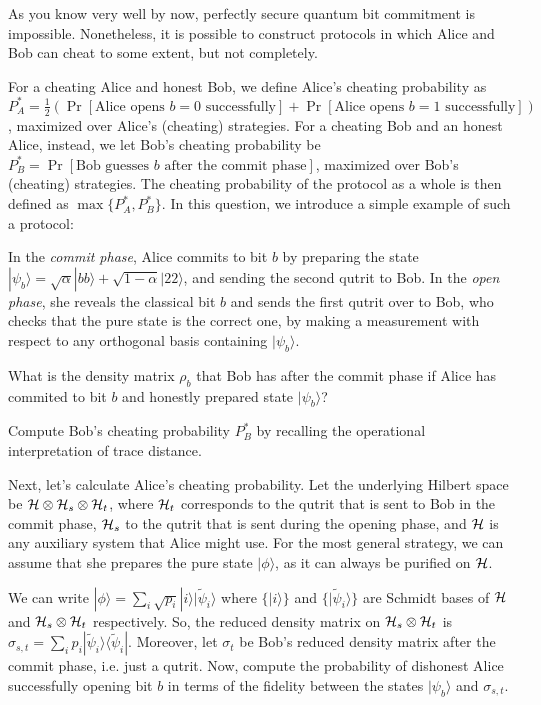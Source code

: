 \documentclass[a4paper,10pt,landscape,twocolumn]{scrartcl}
\newcommand{\ket}[1]{| #1 \rangle}
\newcommand{\bra}[1]{\langle #1 |}
\begin{document}
\begin{exercise}
As you know very well by now, perfectly secure quantum bit commitment is impossible. Nonetheless, it is possible to construct protocols in which Alice and Bob can cheat to some extent, but not completely. 

For a cheating Alice and honest Bob, we define Alice's cheating probability as $P_A^* = \frac12(\Pr[\text{Alice opens $b=0$ successfully}]+ \Pr[\text{Alice opens $b=1$ successfully}])$, maximized over Alice's (cheating) strategies. For a cheating Bob and an honest Alice, instead, we let Bob's cheating probability be
$P_B^*= \Pr[\text{Bob guesses $b$ after the commit phase}]$, maximized over Bob's (cheating) strategies. The cheating probability of the protocol as a whole is then defined as $\max\{P_A^*,P_B^*\}$. In this question, we introduce a simple example of such a protocol:

In the \emph{commit phase}, Alice commits to bit $b$ by preparing the state 
$\ket{\psi_b}= \sqrt{\alpha} \ket{bb} + \sqrt{1-\alpha} \ket{22}$, and sending the second qutrit to Bob. In the \emph{open phase}, she reveals the classical bit $b$ and sends the first qutrit over to Bob, who checks that the pure state is the correct one, by making a measurement with respect to any orthogonal basis containing $\ket{\psi_b}$.

\begin{subex}
What is the density matrix $\rho_b$ that Bob has after the commit phase if Alice has commited to bit $b$ and honestly prepared state $\ket{\psi_b}$?
\end{subex}

\begin{subex} \label{subex:bob}
Compute Bob's cheating probability $P_B^*$ by recalling the operational interpretation of trace distance.
\end{subex}

\begin{subex}
Next, let's calculate Alice's cheating probability. Let the underlying Hilbert space be $\mathcal{H} \otimes \mathcal{H}_s \otimes \mathcal{H}_t$, where $\mathcal{H}_t$ corresponds to the qutrit that is sent to Bob in the commit phase, $\mathcal{H}_s$ to the qutrit that is sent during the opening phase, and $\mathcal{H}$ is any auxiliary system that Alice might use. For the most general strategy, we can assume that she prepares the pure state $\ket{\phi}$, as it can always be purified on $\mathcal{H}$.

We can write $\ket{\phi} = \sum_i \sqrt{p_i} \ket{i} \ket{\tilde{\psi}_{i}}$ where $\{\ket{i}\}$ and $\{ \ket{\tilde{\psi}_{i}} \}$ are Schmidt bases of $\mathcal{H}$ and $\mathcal{H}_s \otimes \mathcal{H}_t$ respectively. So, the reduced density matrix on $\mathcal{H}_s \otimes \mathcal{H}_t$ is $\sigma_{s,t} = \sum_i p_i \ket{\tilde{\psi}_{i}}\bra{\tilde{\psi}_{i}}$. Moreover, let $\sigma_t$ be Bob's reduced density matrix after the commit phase, i.e. just a qutrit.
Now, compute the probability of dishonest Alice successfully opening bit $b$ in terms of the fidelity between the states $\ket{\psi_b}$ and $\sigma_{s,t}$.
\end{subex}


\end{exercise}
\end{document}
